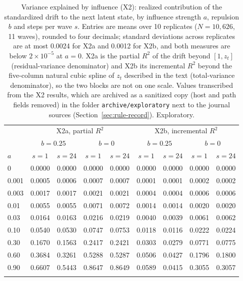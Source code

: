 \begin{table}[htbp]
\centering
\footnotesize
\caption{Variance explained by influence (X2): realized contribution of the standardized drift to the next latent state, by influence strength $a$, repulsion $b$ and steps per wave $s$. Entries are means over 10 replicates ($N=10{,}626$, 11 waves), rounded to four decimals; standard deviations across replicates are at most 0.0024 for X2a and 0.0012 for X2b, and both measures are below $2\times10^{-5}$ at $a=0$. X2a is the partial $R^2$ of the drift beyond $[1,z_t]$ (residual-variance denominator) and X2b its incremental $R^2$ beyond the five-column natural cubic spline of $z_t$ described in the text (total-variance denominator), so the two blocks are not on one scale. Values transcribed from the X2 results, which are archived as a sanitized copy (host and path fields removed) in the folder \texttt{archive/exploratory} next to the journal sources (Section~\ref{sec:rule-record}). Exploratory.}
\label{tab:supp-x2}
\begin{tabular}{@{}lcccccccc@{}}
\toprule
 & \multicolumn{4}{c}{X2a, partial $R^2$} & \multicolumn{4}{c}{X2b, incremental $R^2$} \\
 & \multicolumn{2}{c}{$b=0.25$} & \multicolumn{2}{c}{$b=0$} & \multicolumn{2}{c}{$b=0.25$} & \multicolumn{2}{c}{$b=0$} \\
$a$ & $s=1$ & $s=24$ & $s=1$ & $s=24$ & $s=1$ & $s=24$ & $s=1$ & $s=24$ \\
\midrule
0 & 0.0000 & 0.0000 & 0.0000 & 0.0000 & 0.0000 & 0.0000 & 0.0000 & 0.0000 \\
0.001 & 0.0005 & 0.0006 & 0.0007 & 0.0007 & 0.0001 & 0.0001 & 0.0002 & 0.0002 \\
0.003 & 0.0017 & 0.0017 & 0.0021 & 0.0021 & 0.0004 & 0.0004 & 0.0006 & 0.0006 \\
0.01 & 0.0055 & 0.0055 & 0.0071 & 0.0072 & 0.0014 & 0.0014 & 0.0020 & 0.0020 \\
0.03 & 0.0164 & 0.0163 & 0.0216 & 0.0219 & 0.0040 & 0.0039 & 0.0061 & 0.0062 \\
0.10 & 0.0540 & 0.0530 & 0.0747 & 0.0753 & 0.0118 & 0.0116 & 0.0222 & 0.0224 \\
0.30 & 0.1670 & 0.1563 & 0.2417 & 0.2421 & 0.0303 & 0.0279 & 0.0771 & 0.0775 \\
0.60 & 0.3684 & 0.3261 & 0.5288 & 0.5287 & 0.0506 & 0.0427 & 0.1796 & 0.1800 \\
0.90 & 0.6607 & 0.5443 & 0.8647 & 0.8649 & 0.0589 & 0.0415 & 0.3055 & 0.3057 \\
\botrule
\end{tabular}
\end{table}

\clearpage
